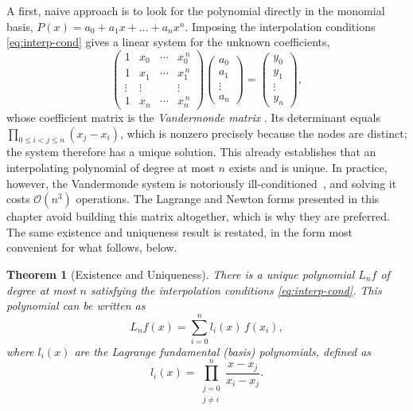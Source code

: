 \documentclass[12pt, a4paper]{article}
\theoremstyle{plain}
\newtheorem{theorem}{Theorem}[section]
\theoremstyle{definition}
\theoremstyle{remark}
\begin{document}
A first, naive approach is to look for the polynomial directly in the monomial basis, $P(x) = a_0 + a_1 x + \dots + a_n x^n$. Imposing the interpolation conditions \eqref{eq:interp-cond} gives a linear system for the unknown coefficients,
\begin{equation}\label{eq:vandermonde}
    \begin{pmatrix}
        1 & x_0 & \cdots & x_0^{\,n} \\
        1 & x_1 & \cdots & x_1^{\,n} \\
        \vdots & \vdots & & \vdots \\
        1 & x_n & \cdots & x_n^{\,n}
    \end{pmatrix}
    \begin{pmatrix} a_0 \\ a_1 \\ \vdots \\ a_n \end{pmatrix}
    =
    \begin{pmatrix} y_0 \\ y_1 \\ \vdots \\ y_n \end{pmatrix},
\end{equation}
whose coefficient matrix is the \emph{Vandermonde matrix} \cite{heath}. Its determinant equals $\prod_{0 \le i < j \le n}(x_j - x_i)$, which is nonzero precisely because the nodes are distinct; the system therefore has a unique solution. This already establishes that an interpolating polynomial of degree at most $n$ exists and is unique. In practice, however, the Vandermonde system is notoriously ill-conditioned~\cite{barwolff}, and solving it costs $\mathcal{O}(n^3)$ operations. The Lagrange and Newton forms presented in this chapter avoid building this matrix altogether, which is why they are preferred. The same existence and uniqueness result is restated, in the form most convenient for what follows, below.

\begin{theorem}[Existence and Uniqueness]\label{thm:exist}
There is a unique polynomial $L_n f$ of degree at most $n$ satisfying the interpolation conditions \eqref{eq:interp-cond}. This polynomial can be written as
\begin{equation}\label{eq:lagrange}
    L_n f(x) = \sum_{i=0}^n l_i(x)\, f(x_i),
\end{equation}
where $l_i(x)$ are the Lagrange fundamental (basis) polynomials, defined as
\begin{equation}\label{eq:basis}
    l_i(x) = \prod_{\substack{j=0 \\ j \neq i}}^n \frac{x - x_j}{x_i - x_j}.
\end{equation}
\end{theorem}
\end{document}

